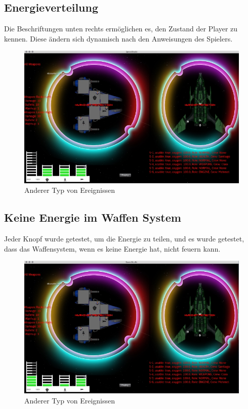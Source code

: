 \documentclass[12pt]{article}
\begin{document}
\newpage
\subsection{Energieverteilung}
Die Beschriftungen unten rechts ermöglichen es, den Zustand der Player zu kennen. Diese ändern sich dynamisch nach den Anweisungen des Spielers.
\begin{figure}[htp]
\centering
\includegraphics[scale=0.7]{TestProtocolBilder/OptimizedEnergieAlleSysteme.png}
\caption{Anderer Typ von Ereignissen}
\end{figure}

\newpage
\subsection{Keine Energie im Waffen System}
Jeder Knopf wurde getestet, um die Energie zu teilen, und es wurde getestet, dass das Waffensystem, wenn es keine Energie hat, nicht feuern kann.
\begin{figure}[htp]
\centering
\includegraphics[scale=0.7]{TestProtocolBilder/OptimizedEnergieVerteilung.png}
\caption{Anderer Typ von Ereignissen}
\end{figure}
\end{document}

